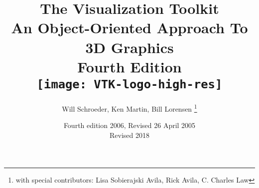 \title{The Visualization Toolkit \\ An Object-Oriented Approach To 3D Graphics \\ Fourth Edition\\  \texttt{[image: VTK-logo-high-res]}\\}
\author{Will Schroeder, Ken Martin, Bill Lorensen
\thanks{with special contributors: Lisa Sobierajski Avila, Rick Avila, C. Charles Law}
\date {Fourth edition 2006, Revised 26 April 2005\\Revised 2018}}

\clearpage\maketitle
\thispagestyle{empty}



